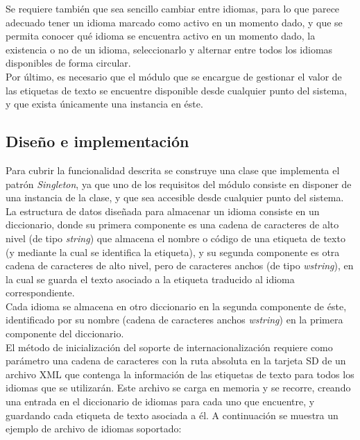 Se requiere también que sea sencillo cambiar entre idiomas, para lo que parece adecuado tener un idioma marcado como activo en un momento dado, y que se permita conocer qué idioma se encuentra activo en un momento dado, la existencia o no de un idioma, seleccionarlo y alternar entre todos los idiomas disponibles de forma circular.\\

Por último, es necesario que el módulo que se encargue de gestionar el valor de las etiquetas de texto se encuentre disponible desde cualquier punto del sistema, y que exista únicamente una instancia en éste.

\subsection{Diseño e implementación}

Para cubrir la funcionalidad descrita se construye una clase que implementa el patrón \emph{Singleton}, ya que uno de los requisitos del módulo consiste en disponer de una instancia de la clase, y que sea accesible desde cualquier punto del sistema.\\

La estructura de datos diseñada para almacenar un idioma consiste en un diccionario, donde su primera componente es una cadena de caracteres de alto nivel (de tipo \emph{string}) que almacena el nombre o código de una etiqueta de texto (y mediante la cual se identifica la etiqueta), y su segunda componente es otra cadena de caracteres de alto nivel, pero de caracteres anchos (de tipo \emph{wstring}), en la cual se guarda el texto asociado a la etiqueta traducido al idioma correspondiente.\\

Cada idioma se almacena en otro diccionario en la segunda componente de éste, identificado por su nombre (cadena de caracteres anchos \emph{wstring}) en la primera componente del diccionario.\\

El método de inicialización del soporte de internacionalización requiere como parámetro una cadena de caracteres con la ruta absoluta en la tarjeta SD de un archivo XML que contenga la información de las etiquetas de texto para todos los idiomas que se utilizarán. Este archivo se carga en memoria y se recorre, creando una entrada en el diccionario de idiomas para cada uno que encuentre, y guardando cada etiqueta de texto asociada a él. A continuación se muestra un ejemplo de archivo de idiomas soportado:

